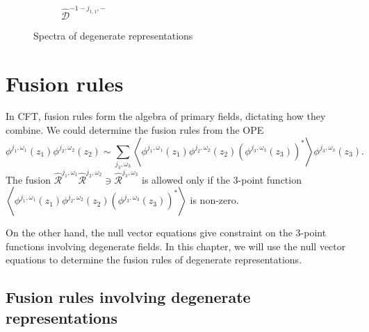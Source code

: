 \documentclass[10pt,a4paper]{article}
\numberwithin{equation}{section}
\newcommand{\vev}[1]{\left\langle #1 \right\rangle}
\begin{document}
\begin{figure}[htbp]
\begin{subfigure}[b]{0.48\textwidth}
        \caption{$\widehat{\mathcal{D}}^{-1-j_{1,1}, -}$}
        \label{fig:E 1_-1}
    \end{subfigure}

    \caption{Spectra of degenerate representations}
    \label{fig:degrep}
\end{figure}

\section{Fusion rules}
In CFT, fusion rules form the algebra of primary fields, dictating how they combine. We could determine the fusion rules from the 
OPE 
\begin{equation}
    \phi^{j_{1},\omega_{1}}(z_{1}) \phi^{j_{2},\omega_{2}}(z_{2}) \sim \sum_{j_{3},\omega_{3}}
    \vev{\phi^{j_{1},\omega_{1}}(z_{1}) \phi^{j_{2},\omega_{2}}(z_{2}) \left(\phi^{j_{3},\omega_{3}}(z_{3}) \right)^{*}} \phi^{j_{3},\omega_{3}}(z_{3}).
\end{equation}
The fusion $\widehat{\mathcal{R}}^{j_{1},\omega_{1}} \widehat{\mathcal{R}}^{j_{2},\omega_{2}} \ni \widehat{\mathcal{R}}^{j_{3},\omega_{3}}$
is allowed only if the 3-point function 
$\vev{\phi^{j_{1},\omega_{1}}(z_{1}) \phi^{j_{2},\omega_{2}}(z_{2}) \left(\phi^{j_{3},\omega_{3}}(z_{3}) \right)^{*}}$ is non-zero.

On the other hand, the null vector equations give constraint on the 3-point functions involving degenerate fields. In this chapter, we 
will use the null vector equations to determine the fusion rules of degenerate representations.

\subsection{Fusion rules involving degenerate representations}
\end{document}
